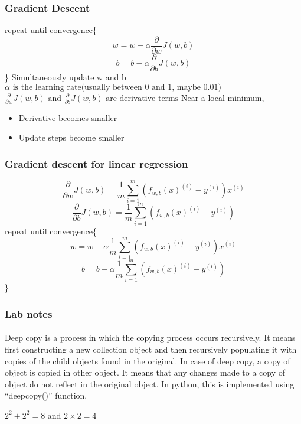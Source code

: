 \documentclass{article}
\begin{document}
    \subsubsection{Gradient Descent}
    repeat until convergence\{
    \[ w=w-\alpha\frac{\partial}{\partial w}J(w,b) \]
    \[ b=b-\alpha\frac{\partial}{\partial b}J(w,b) \]
    \} \newline
    Simultaneously update w and b \newline
    $\alpha\text{ is the learning rate(usually between 0 and 1, maybe 0.01)}$ \newline
    $\frac{\partial}{\partial w}J(w,b)\text{ and }\frac{\partial}{\partial b}J(w,b)\text{ are derivative terms}$ \newline
    Near a local minimum,
    \begin{itemize}
        \item Derivative becomes smaller
        \item Update steps become smaller
    \end{itemize}
    \subsubsection{Gradient descent for linear regression}
    \[\frac{\partial}{\partial w}J(w,b) = \frac{1}{m}\sum_{i=1}^{m}(f_{w,b}(x)^{(i)}-y^{(i)})x^{(i)}\]
    \[\frac{\partial}{\partial b}J(w,b) = \frac{1}{m}\sum_{i=1}^{m}(f_{w,b}(x)^{(i)}-y^{(i)})\]
    repeat until convergence\{
    \[w = w - \alpha\frac{1}{m}\sum_{i=1}^{m}(f_{w,b}(x)^{(i)}-y^{(i)})x^{(i)}\]
    \[b = b - \alpha\frac{1}{m}\sum_{i=1}^{m}(f_{w,b}(x)^{(i)}-y^{(i)})\]
    \} 
    \subsubsection{Lab notes}
    \paragraph{}
    Deep copy is a process in which the copying process occurs recursively. It means first constructing a new collection object and then recursively populating it with copies of the child objects found in the original. In case of deep copy, a copy of object is copied in other object. It means that any changes made to a copy of object do not reflect in the original object. In python, this is implemented using “deepcopy()” function.


    \newpage
    $ 2^{2} + 2^{2} = 8$ and $ 2 \times 2 = 4$
\end{document}
